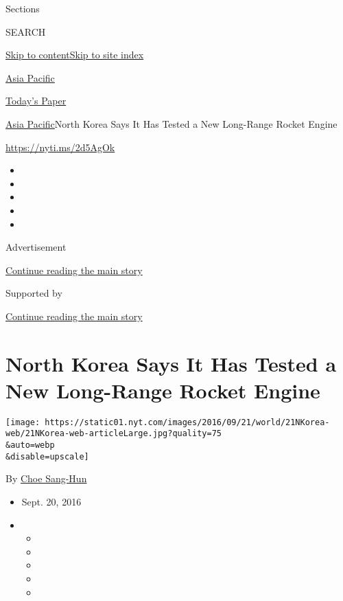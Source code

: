 Sections

SEARCH

\protect\hyperlink{site-content}{Skip to
content}\protect\hyperlink{site-index}{Skip to site index}

\href{https://www.nytimes.com/section/world/asia}{Asia Pacific}

\href{https://myaccount.nytimes.com/auth/login?response_type=cookie\&client_id=vi}{}

\href{https://www.nytimes.com/section/todayspaper}{Today's Paper}

\href{/section/world/asia}{Asia Pacific}\textbar{}North Korea Says It
Has Tested a New Long-Range Rocket Engine

\url{https://nyti.ms/2d5AgOk}

\begin{itemize}
\item
\item
\item
\item
\item
\end{itemize}

Advertisement

\protect\hyperlink{after-top}{Continue reading the main story}

Supported by

\protect\hyperlink{after-sponsor}{Continue reading the main story}

\hypertarget{north-korea-says-it-has-tested-a-new-long-range-rocket-engine}{%
\section{North Korea Says It Has Tested a New Long-Range Rocket
Engine}\label{north-korea-says-it-has-tested-a-new-long-range-rocket-engine}}

\texttt{[image: https://static01.nyt.com/images/2016/09/21/world/21NKorea-web/21NKorea-web-articleLarge.jpg?quality=75\\\&auto=webp\\\&disable=upscale]}

By \href{http://www.nytimes.com/by/choe-sang-hun}{Choe Sang-Hun}

\begin{itemize}
\item
  Sept. 20, 2016
\item
  \begin{itemize}
  \item
  \item
  \item
  \item
  \item
  \end{itemize}
\end{itemize}

